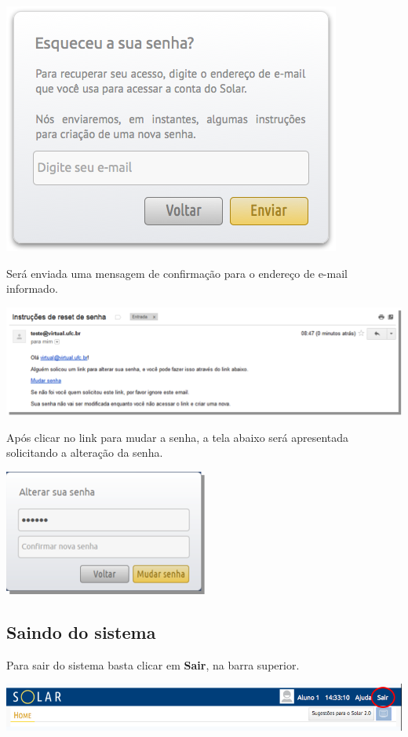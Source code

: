 \documentclass[letterpaper,10pt,english]{sphinxmanual}
\begin{document}
{\hfill\includegraphics{password-01.png}\hfill}

Será enviada uma mensagem de confirmação para o endereço de e-mail informado.

{\hfill\includegraphics{password-02.png}\hfill}

Após clicar no link para mudar a senha, a tela abaixo será apresentada solicitando a alteração da senha.

{\hfill\includegraphics{password-03.png}\hfill}


\subsection{Saindo do sistema}
\label{access:saindo-do-sistema}\label{access:sair-sistema}
Para sair do sistema basta clicar em \textbf{Sair}, na barra superior.

{\hfill\includegraphics{logout-01.png}\hfill}
\end{document}
